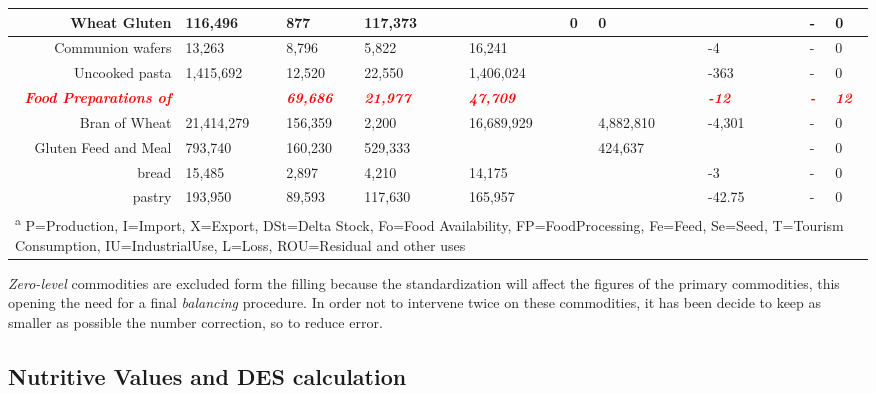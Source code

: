 \documentclass[]{article}
\begin{document}
\begin{landscape}
\begin{table}
{\begin{tabular}[t]{r|l|l|l|l|l|l|l|l|l|l|l|l|l}
\hline
Wheat Gluten & 116,496 & 877 & 117,373 &  &  & 0 & 0 &  &  &  &  & - & 0\\
\hline
Communion wafers & 13,263 & 8,796 & 5,822 &  & 16,241 &  &  &  & -4 &  &  & - & 0\\
\hline
Uncooked pasta & 1,415,692 & 12,520 & 22,550 &  & 1,406,024 &  &  &  & -363 &  &  & - & 0\\
\hline
\textcolor{red}{\em{\textbf{Food Preparations of}}} & \textcolor{red}{\em{\textbf{}}} & \textcolor{red}{\em{\textbf{69,686}}} & \textcolor{red}{\em{\textbf{21,977}}} & \textcolor{red}{\em{\textbf{}}} & \textcolor{red}{\em{\textbf{47,709}}} & \textcolor{red}{\em{\textbf{}}} & \textcolor{red}{\em{\textbf{}}} & \textcolor{red}{\em{\textbf{}}} & \textcolor{red}{\em{\textbf{-12}}} & \textcolor{red}{\em{\textbf{}}} & \textcolor{red}{\em{\textbf{}}} & \textcolor{red}{\em{\textbf{-}}} & \textcolor{red}{\em{\textbf{12}}}\\
\hline
Bran of Wheat & 21,414,279 & 156,359 & 2,200 &  & 16,689,929 &  & 4,882,810 &  & -4,301 &  &  & - & 0\\
\hline
Gluten Feed and Meal & 793,740 & 160,230 & 529,333 &  &  &  & 424,637 &  &  &  &  & - & 0\\
\hline
bread & 15,485 & 2,897 & 4,210 &  & 14,175 &  &  &  & -3 &  &  & - & 0\\
\hline
pastry & 193,950 & 89,593 & 117,630 &  & 165,957 &  &  &  & -42.75 &  &  & - & 0\\
\hline
\multicolumn{14}{l}{\textsuperscript{a} P=Production, I=Import, X=Export, DSt=Delta Stock, Fo=Food Availability, FP=FoodProcessing, Fe=Feed, Se=Seed, T=Tourism Consumption, IU=IndustrialUse, L=Loss, ROU=Residual and other uses}\\
\end{tabular}}
\end{table}
\end{landscape}

\emph{Zero-level} commodities are excluded form the filling because the
standardization will affect the figures of the primary commodities, this
opening the need for a final \emph{balancing} procedure. In order not to
intervene twice on these commodities, it has been decide to keep as
smaller as possible the number correction, so to reduce error.

\subsection*{Nutritive Values and DES
calculation}\label{nutritive-values-and-des-calculation}
\end{document}
